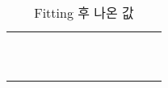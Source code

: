 \begin{table}[!h]
{\begin{tabular}{ccccccccllll}
\multicolumn{1}{l}{} & \multicolumn{1}{l}{} & \multicolumn{1}{l}{} & \multicolumn{1}{l}{} & \multicolumn{1}{l}{} & \multicolumn{1}{l}{} & \multicolumn{1}{l}{} & \multicolumn{1}{l}{} &  &  &  &  \\
\multicolumn{1}{l}{} & \multicolumn{1}{l}{} & \multicolumn{1}{l}{} & \multicolumn{1}{l}{} & \multicolumn{1}{l}{} & \multicolumn{1}{l}{} & \multicolumn{1}{l}{} & \multicolumn{1}{l}{} &  &  &  &  \\
\multicolumn{1}{l}{} & \multicolumn{1}{l}{} & \multicolumn{1}{l}{} & \multicolumn{1}{l}{} & \multicolumn{1}{l}{} & \multicolumn{1}{l}{} & \multicolumn{1}{l}{} & \multicolumn{1}{l}{} &  &  &  &  \\
\multicolumn{1}{l}{} & \multicolumn{1}{l}{} & \multicolumn{1}{l}{} & \multicolumn{1}{l}{} & \multicolumn{1}{l}{} & \multicolumn{1}{l}{} & \multicolumn{1}{l}{} & \multicolumn{1}{l}{} &  &  &  &  \\
\multicolumn{1}{l}{} & \multicolumn{1}{l}{} & \multicolumn{1}{l}{} & \multicolumn{1}{l}{} & \multicolumn{1}{l}{} & \multicolumn{1}{l}{} & \multicolumn{1}{l}{} & \multicolumn{1}{l}{} &  &  &  &  \\
\multicolumn{1}{l}{} & \multicolumn{1}{l}{} & \multicolumn{1}{l}{} & \multicolumn{1}{l}{} & \multicolumn{1}{l}{} & \multicolumn{1}{l}{} & \multicolumn{1}{l}{} & \multicolumn{1}{l}{} &  &  &  &  \\
\multicolumn{1}{l}{} & \multicolumn{1}{l}{} & \multicolumn{1}{l}{} & \multicolumn{1}{l}{} & \multicolumn{1}{l}{} & \multicolumn{1}{l}{} & \multicolumn{1}{l}{} & \multicolumn{1}{l}{} &  &  &  &  \\
\multicolumn{1}{l}{} & \multicolumn{1}{l}{} & \multicolumn{1}{l}{} & \multicolumn{1}{l}{} & \multicolumn{1}{l}{} & \multicolumn{1}{l}{} & \multicolumn{1}{l}{} & \multicolumn{1}{l}{} &  &  &  &  \\
\multicolumn{1}{l}{} & \multicolumn{1}{l}{} & \multicolumn{1}{l}{} & \multicolumn{1}{l}{} & \multicolumn{1}{l}{} & \multicolumn{1}{l}{} & \multicolumn{1}{l}{} & \multicolumn{1}{l}{} &  &  &  &  \\
\multicolumn{1}{l}{} & \multicolumn{1}{l}{} & \multicolumn{1}{l}{} & \multicolumn{1}{l}{} & \multicolumn{1}{l}{} & \multicolumn{1}{l}{} & \multicolumn{1}{l}{} & \multicolumn{1}{l}{} &  &  &  & 
\end{tabular}}
\vspace{-3.5cm}
\caption{Fitting 후 나온 값}
\end{table}